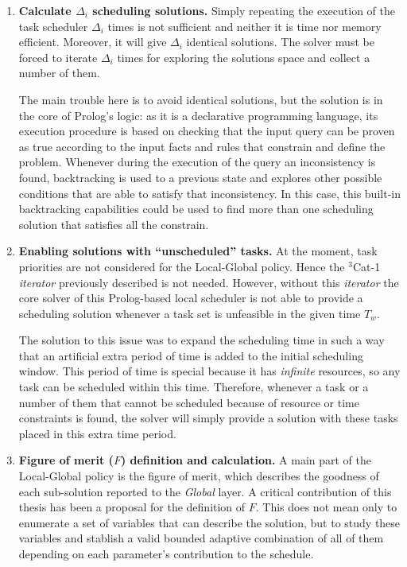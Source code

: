 \begin{enumerate}
\item \textbf{Calculate $\Delta_i$ scheduling solutions.} Simply repeating the execution of the task scheduler $\Delta_i$ times is not sufficient and neither it is time nor memory efficient. Moreover, it will give $\Delta_i$ identical solutions. The solver must be forced to iterate $\Delta_i$ times for exploring the solutions space and collect a number of them.

The main trouble here is to avoid identical solutions, but the solution is in the core of Prolog's logic: as it is a declarative programming language, its execution procedure is based on checking that the input query can be proven as true according to the input facts and rules that constrain and define the problem. Whenever during the execution of the query an inconsistency is found, backtracking is used to a previous state and explores other possible conditions that are able to satisfy that inconsistency. In this case, this built-in backtracking capabilities could be used to find more than one scheduling solution that satisfies all the constrain.

\item \textbf{Enabling solutions with ``unscheduled'' tasks.} %
At the moment, task priorities are not considered for the Local-Global policy. Hence the $^3$Cat-1 \emph{iterator} previously described is not needed. However, without this \emph{iterator} the core solver of this Prolog-based local scheduler is not able to provide a scheduling solution whenever a task set is unfeasible in the given time $T_w$.

The solution to this issue was to expand the scheduling time in such a way that an artificial extra period of time is added to the initial scheduling window. This period of time is special because it has \emph{infinite} resources, so any task can be scheduled within this time. Therefore, whenever a task or a number of them that cannot be scheduled because of resource or time constraints is found, the solver will simply provide a solution with these tasks placed in this extra time period.

\item \textbf{Figure of merit ($F$) definition and calculation.} A main part of the Local-Global policy is the figure of merit, which describes the goodness of each sub-solution reported to the \emph{Global} layer. A critical contribution of this thesis has been a proposal for the definition of $F$. This does not mean only to enumerate a set of variables that can describe the solution, but to study these variables and stablish a valid bounded adaptive combination of all of them depending on each parameter's contribution to the schedule. 


\end{enumerate}
